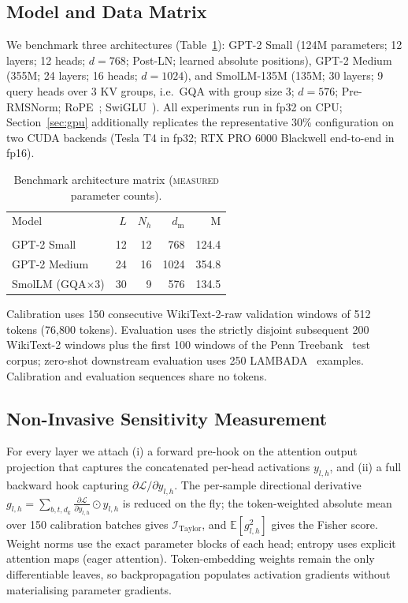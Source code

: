 \documentclass[10pt,journal,compsoc]{IEEEtran}
\begin{document}
\subsection{Model and Data Matrix}
We benchmark three architectures (Table~\ref{tab:arch}): GPT-2 Small
(124M parameters; 12 layers; 12 heads; $d=768$; Post-LN; learned absolute
positions), GPT-2 Medium (355M; 24 layers; 16 heads; $d=1024$), and
SmolLM-135M (135M; 30 layers; 9 query heads over 3 KV groups, i.e.\ GQA with
group size 3; $d=576$; Pre-RMSNorm; RoPE~\cite{su2024roformer}; SwiGLU~\cite{shazeer2020glu}).
All experiments run in fp32 on CPU; Section~\ref{sec:gpu}
additionally replicates the representative 30\% configuration on two CUDA
backends (Tesla T4 in fp32; RTX PRO 6000 Blackwell end-to-end in fp16).

\begin{table}[!t]
\caption{Benchmark architecture matrix (\textsc{measured} parameter counts).}
\label{tab:arch}
\centering
\footnotesize
\scriptsize
\begin{tabular}{lrrrr}
\toprule
Model & $L$ & $N_h$ & $d_{\text{m}}$ & M\\ \\
\midrule
GPT-2 Small & 12 & 12 & 768 & 124.4 \\
GPT-2 Medium & 24 & 16 & 1024 & 354.8 \\
SmolLM (GQA$\times$3) & 30 & 9 & 576 & 134.5 \\
\bottomrule
\end{tabular}
\end{table}

Calibration uses 150 consecutive WikiText-2-raw validation windows of 512 tokens
(76{,}800 tokens). Evaluation uses the strictly disjoint subsequent 200
WikiText-2 windows plus the first 100 windows of the Penn
Treebank~\cite{marcus1994penn,merity2016pointer} test corpus; zero-shot
downstream evaluation uses 250 LAMBADA~\cite{paperno2016lambada} examples.
Calibration and evaluation sequences share no tokens.

\subsection{Non-Invasive Sensitivity Measurement}
For every layer we attach (i) a forward pre-hook on the attention output
projection that captures the concatenated per-head activations
$y_{l,h}$, and (ii) a full backward hook capturing
$\partial\mathcal{L}/\partial y_{l,h}$. The per-sample directional derivative
$g_{l,h}=\sum_{b,t,d_k}\frac{\partial\mathcal{L}}{\partial y_{l,h}}\odot y_{l,h}$ is
reduced on the fly; the token-weighted absolute mean over 150 calibration batches
gives $\mathcal{I}_{\text{Taylor}}$, and $\mathbb{E}[g^2_{l,h}]$ gives the Fisher
score. Weight norms use the exact parameter blocks of each head; entropy uses
explicit attention maps (eager attention). Token-embedding weights remain the only
differentiable leaves, so backpropagation populates activation gradients without
materialising parameter gradients.
\end{document}
